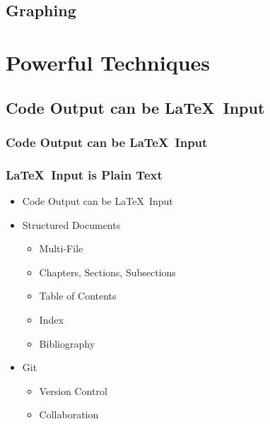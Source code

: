 \documentclass{beamer}
\begin{document}
\begin{frame}[t, fragile]
	\frametitle{}
\Large
\hfil
\lstset{style=mystyle}

\end{frame}


\subsection{Graphing}


\section{Powerful Techniques}
\subsection{Code Output can be \LaTeX \ Input}

\begin{frame}[t]
	\frametitle{Code Output can be \LaTeX \ Input}
\Large
\lstset{style=mystyle}

\end{frame}

\begin{frame}[t]
	\frametitle{}
\Large
\lstset{style=mystyle}

\end{frame}

\begin{frame}[t]
	\frametitle{}
\Large
\lstset{style=mystyle}


\end{frame}

\begin{frame}[t]
	\frametitle{\LaTeX \ Input is Plain Text}
\Large
\begin{itemize}
	\item Code Output can be \LaTeX \ Input
	\item Structured Documents
	\begin{itemize}
		\item Multi-File
		\item Chapters, Sections, Subsections
		\item Table of Contents
		\item Index
		\item Bibliography
	\end{itemize}
	\item Git
	\begin{itemize}
		\item Version Control
		\item Collaboration
	\end{itemize}
\end{itemize}


\end{frame}



%
%
\end{document}

